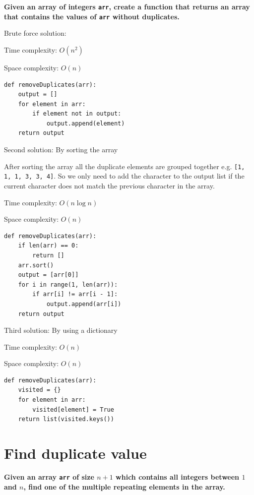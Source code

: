 \documentclass[a4paper,11pt]{book}
\begin{document}
\textbf{Given an array of integers \lstinline{arr}, create a function that returns an array that contains the values of \lstinline{arr} without duplicates.}
\vspace{5mm}

\noindent Brute force solution:

\noindent Time complexity: $O(n^2)$

\noindent Space complexity: $O(n)$

\begin{lstlisting}
def removeDuplicates(arr):
    output = []
    for element in arr:
        if element not in output:
            output.append(element)
    return output
\end{lstlisting}

\noindent Second solution: By sorting the array

After sorting the array all the duplicate elements are grouped together e.g. \lstinline{[1, 1, 1, 3, 3, 4]}. So we only need to add the character to the output list if the current character does not match the previous character in the array.

\noindent Time complexity: $O(n\log n)$

\noindent Space complexity: $O(n)$

\begin{lstlisting}
def removeDuplicates(arr):
    if len(arr) == 0:
        return []
    arr.sort()
    output = [arr[0]]
    for i in range(1, len(arr)):
        if arr[i] != arr[i - 1]:
            output.append(arr[i])
    return output
\end{lstlisting}

\noindent Third solution: By using a dictionary

\noindent Time complexity: $O(n)$

\noindent Space complexity: $O(n)$

\begin{lstlisting}
def removeDuplicates(arr):
    visited = {}
    for element in arr:
        visited[element] = True
    return list(visited.keys())
\end{lstlisting}

\newpage
\section{Find duplicate value}

\textbf{Given an array \lstinline{arr} of size $n + 1$ which contains all integers between $1$ and $n$, find one of the multiple repeating elements in the array. }
\vspace{5mm}
\end{document}
